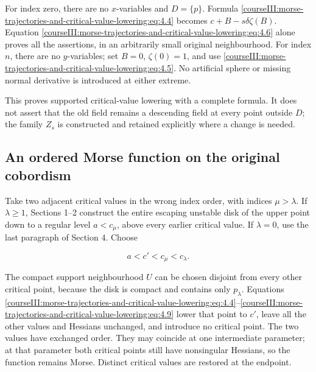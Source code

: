 For index zero, there are no \(x\)-variables and \(D=\{p\}\). Formula \eqref{courseIII:morse-trajectories-and-critical-value-lowering:eq:4.4} becomes
\(c+B-s\delta\zeta(B)\). Equation \eqref{courseIII:morse-trajectories-and-critical-value-lowering:eq:4.6} alone proves all the assertions, in an arbitrarily small original neighbourhood. For index \(n\), there are no \(y\)-variables; set \(B=0\), \(\zeta(0)=1\), and use \eqref{courseIII:morse-trajectories-and-critical-value-lowering:eq:4.5}. No artificial sphere or missing normal derivative is introduced at either extreme.

This proves supported critical-value lowering with a complete formula. It does not assert that the old field remains a descending field at every point outside \(D\); the family \(Z_s\) is constructed and retained explicitly where a change is needed.

\subsection{An ordered Morse function on the original cobordism}
\label{courseIII:morse-trajectories-and-critical-value-lowering:trajectory-ordered-morse}

\label{courseIII:morse-trajectories-and-critical-value-lowering:section-5}\label{courseIII:trajectory-lowering:5}

Take two adjacent critical values in the wrong index order, with indices \(\mu>\lambda\). If \(\lambda\geq1\), Sections 1--2 construct the entire escaping unstable disk of the upper point down to a regular level \(a<c_\mu\), above every earlier critical value. If \(\lambda=0\), use the last paragraph of Section 4. Choose

\begin{equation}
a<c'<c_\mu<c_\lambda.
 \label{courseIII:morse-trajectories-and-critical-value-lowering:eq:5.1}
\end{equation}

The compact support neighbourhood \(U\) can be chosen disjoint from every other critical point, because the disk is compact and contains only \(p_\lambda\). Equations \eqref{courseIII:morse-trajectories-and-critical-value-lowering:eq:4.4}--\eqref{courseIII:morse-trajectories-and-critical-value-lowering:eq:4.9} lower that point to \(c'\), leave all the other values and Hessians unchanged, and introduce no critical point. The two values have exchanged order. They may coincide at one intermediate parameter; at that parameter both critical points still have nonsingular Hessians, so the function remains Morse. Distinct critical values are restored at the endpoint.

